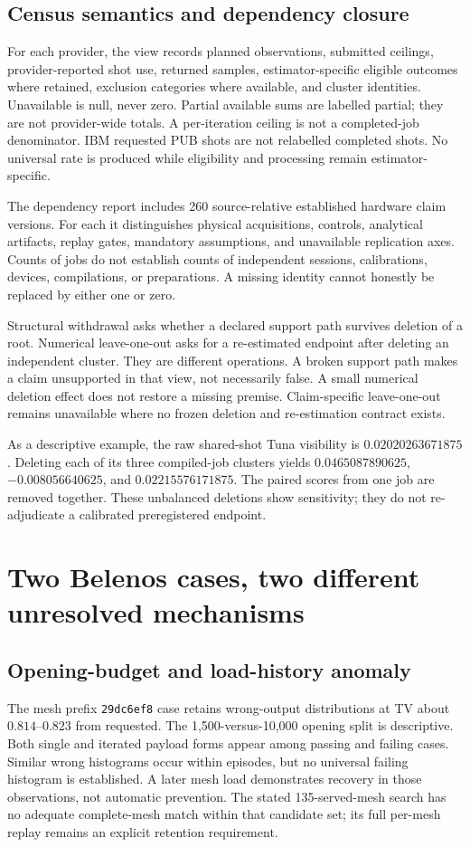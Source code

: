 \documentclass[11pt,a4paper]{article}
\begin{document}
\subsection{Census semantics and dependency closure}
For each provider, the view records planned observations, submitted ceilings, provider-reported shot use, returned samples, estimator-specific eligible outcomes where retained, exclusion categories where available, and cluster identities. Unavailable is null, never zero. Partial available sums are labelled partial; they are not provider-wide totals. A per-iteration ceiling is not a completed-job denominator. IBM requested PUB shots are not relabelled completed shots. No universal rate is produced while eligibility and processing remain estimator-specific.

The dependency report includes 260 source-relative established hardware claim versions. For each it distinguishes physical acquisitions, controls, analytical artifacts, replay gates, mandatory assumptions, and unavailable replication axes. Counts of jobs do not establish counts of independent sessions, calibrations, devices, compilations, or preparations. A missing identity cannot honestly be replaced by either one or zero.

Structural withdrawal asks whether a declared support path survives deletion of a root. Numerical leave-one-out asks for a re-estimated endpoint after deleting an independent cluster. They are different operations. A broken support path makes a claim unsupported in that view, not necessarily false. A small numerical deletion effect does not restore a missing premise. Claim-specific leave-one-out remains unavailable where no frozen deletion and re-estimation contract exists.

As a descriptive example, the raw shared-shot Tuna visibility is $0.02020263671875$. Deleting each of its three compiled-job clusters yields $0.0465087890625$, $-0.008056640625$, and $0.02215576171875$. The paired scores from one job are removed together. These unbalanced deletions show sensitivity; they do not re-adjudicate a calibrated preregistered endpoint.

\section{Two Belenos cases, two different unresolved mechanisms}
\subsection{Opening-budget and load-history anomaly}
The mesh prefix \texttt{29dc6ef8} case retains wrong-output distributions at TV about $0.814$--$0.823$ from requested. The 1,500-versus-10,000 opening split is descriptive. Both single and iterated payload forms appear among passing and failing cases. Similar wrong histograms occur within episodes, but no universal failing histogram is established. A later mesh load demonstrates recovery in those observations, not automatic prevention. The stated 135-served-mesh search has no adequate complete-mesh match within that candidate set; its full per-mesh replay remains an explicit retention requirement.
\end{document}

